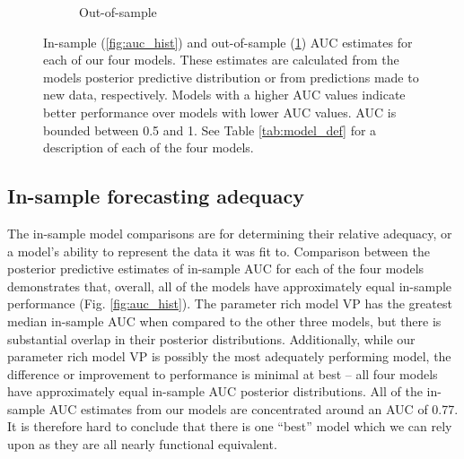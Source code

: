 \documentclass[12pt,letterpaper]{article}
\begin{document}
\begin{refsection}
\begin{figure}[ht]
\begin{subfigure}[ht]{0.45\textwidth}
    \caption{Out-of-sample}
    \label{fig:fold_auc}
  \end{subfigure}
  \caption{In-sample (\ref{fig:auc_hist}) and out-of-sample (\ref{fig:fold_auc}) AUC estimates for each of our four models. These estimates are calculated from the models posterior predictive distribution or from predictions made to new data, respectively. Models with a higher AUC values indicate better performance over models with lower AUC values. AUC is bounded between 0.5 and 1. See Table \ref{tab:model_def} for a description of each of the four models.}
  \label{fig:auc_compare}
\end{figure}

\subsection{In-sample forecasting adequacy}

The in-sample model comparisons are for determining their relative adequacy, or a model's ability to represent the data it was fit to. Comparison between the posterior predictive estimates of in-sample AUC for each of the four models demonstrates that, overall, all of the models have approximately equal in-sample performance (Fig. \ref{fig:auc_hist}). The parameter rich model VP has the greatest median in-sample AUC when compared to the other three models, but there is substantial overlap in their posterior distributions. Additionally, while our parameter rich model VP is possibly the most adequately performing model, the difference or improvement to performance is minimal at best -- all four models have approximately equal in-sample AUC posterior distributions. All of the in-sample AUC estimates from our models are concentrated around an AUC of 0.77. It is therefore hard to conclude that there is one ``best'' model which we can rely upon as they are all nearly functional equivalent. 




\end{refsection}
\end{document}
